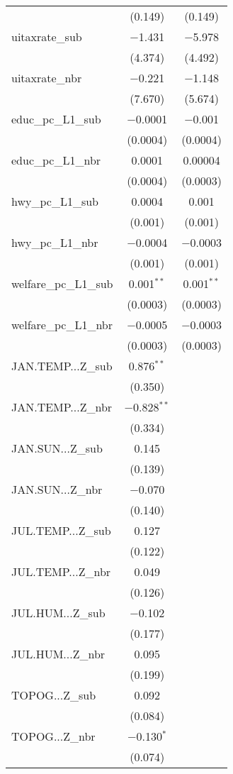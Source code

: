 \begin{table}[!htbp]
\begin{tabular}{@{\extracolsep{5pt}}lcc}
  & (0.149) & (0.149) \\ 
  uitaxrate\_sub & $-$1.431 & $-$5.978 \\ 
  & (4.374) & (4.492) \\ 
  uitaxrate\_nbr & $-$0.221 & $-$1.148 \\ 
  & (7.670) & (5.674) \\ 
  educ\_pc\_L1\_sub & $-$0.0001 & $-$0.001 \\ 
  & (0.0004) & (0.0004) \\ 
  educ\_pc\_L1\_nbr & 0.0001 & 0.00004 \\ 
  & (0.0004) & (0.0003) \\ 
  hwy\_pc\_L1\_sub & 0.0004 & 0.001 \\ 
  & (0.001) & (0.001) \\ 
  hwy\_pc\_L1\_nbr & $-$0.0004 & $-$0.0003 \\ 
  & (0.001) & (0.001) \\ 
  welfare\_pc\_L1\_sub & 0.001$^{**}$ & 0.001$^{**}$ \\ 
  & (0.0003) & (0.0003) \\ 
  welfare\_pc\_L1\_nbr & $-$0.0005 & $-$0.0003 \\ 
  & (0.0003) & (0.0003) \\ 
  JAN.TEMP...Z\_sub & 0.876$^{**}$ &  \\ 
  & (0.350) &  \\ 
  JAN.TEMP...Z\_nbr & $-$0.828$^{**}$ &  \\ 
  & (0.334) &  \\ 
  JAN.SUN...Z\_sub & 0.145 &  \\ 
  & (0.139) &  \\ 
  JAN.SUN...Z\_nbr & $-$0.070 &  \\ 
  & (0.140) &  \\ 
  JUL.TEMP...Z\_sub & 0.127 &  \\ 
  & (0.122) &  \\ 
  JUL.TEMP...Z\_nbr & 0.049 &  \\ 
  & (0.126) &  \\ 
  JUL.HUM...Z\_sub & $-$0.102 &  \\ 
  & (0.177) &  \\ 
  JUL.HUM...Z\_nbr & 0.095 &  \\ 
  & (0.199) &  \\ 
  TOPOG...Z\_sub & 0.092 &  \\ 
  & (0.084) &  \\ 
  TOPOG...Z\_nbr & $-$0.130$^{*}$ &  \\ 
  & (0.074) &  \\ 

\end{tabular}
\end{table}
